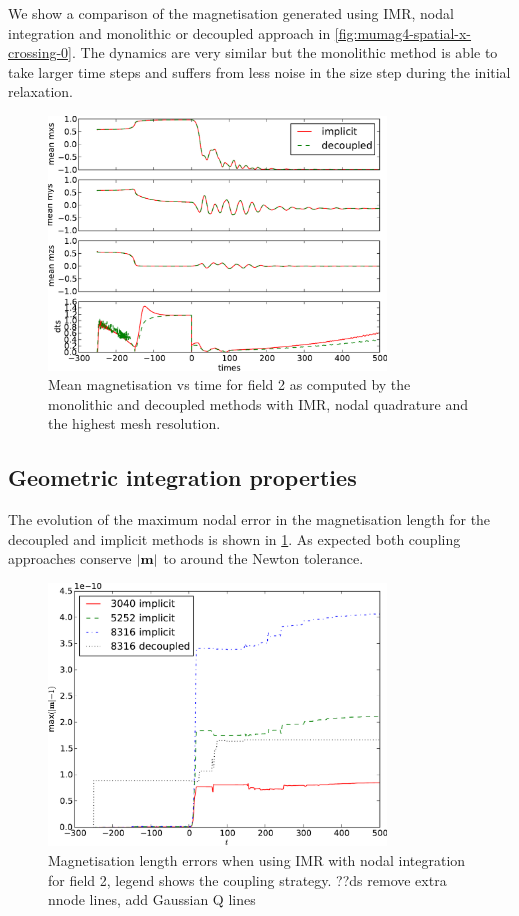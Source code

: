 We show a comparison of the magnetisation generated using IMR, nodal integration and monolithic or decoupled approach in \cref{fig:mumag4-spatial-x-crossing-0}.
The dynamics are very similar but the monolithic method is able to take larger time steps and suffers from less noise in the size step during the initial relaxation.
\begin{figure}
  \centering
  \includegraphics[width=0.8\textwidth]
  {plots/monolithic_vs_decoupled/meanmxsvs-meanmysvs-meanmzsvs-dtsvstimes.pdf}
  \caption{Mean magnetisation vs time for field 2 as computed by the monolithic and decoupled methods with IMR, nodal quadrature and the highest mesh resolution.}
  \label{fig:mumag4-implicit-decoupled}
\end{figure}

\subsection{Geometric integration properties}

The evolution of the maximum nodal error in the magnetisation length for the decoupled and implicit methods is shown in \cref{fig:mumag4-implicit-decoupled}.
As expected both coupling approaches conserve $\left|{\boldsymbol{\mathrm{m}}} \right|$ to around the Newton tolerance.
\begin{figure}
  \centering
  \includegraphics[width=0.8\textwidth]{plots/mumag4_ml/mlengtherrormaxesvstimes.pdf}
  \caption{Magnetisation length errors when using IMR with nodal integration for field 2, legend shows the coupling strategy. ??ds remove extra nnode lines, add Gaussian Q lines}
  \label{fig:imr-conservation}
\end{figure}


